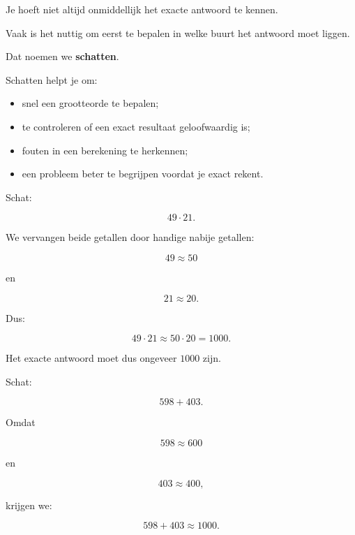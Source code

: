 \documentclass{ximera}
\begin{document}


Je hoeft niet altijd onmiddellijk het exacte antwoord te kennen.

Vaak is het nuttig om eerst te bepalen in welke buurt het antwoord moet
liggen.

Dat noemen we \textbf{schatten}.

Schatten helpt je om:

\begin{itemize}
    \item snel een grootteorde te bepalen;
    \item te controleren of een exact resultaat geloofwaardig is;
    \item fouten in een berekening te herkennen;
    \item een probleem beter te begrijpen voordat je exact rekent.
\end{itemize}


\begin{voorbeeld}

Schat:

\[
49\cdot21.
\]

We vervangen beide getallen door handige nabije getallen:

\[
49\approx50
\]

en

\[
21\approx20.
\]

Dus:

\[
49\cdot21
\approx
50\cdot20
=
1000.
\]

Het exacte antwoord moet dus ongeveer \(1000\) zijn.

\end{voorbeeld}


\begin{voorbeeld}

Schat:

\[
598+403.
\]

Omdat

\[
598\approx600
\]

en

\[
403\approx400,
\]

krijgen we:

\[
598+403\approx1000.
\]

\end{voorbeeld}
\end{document}
